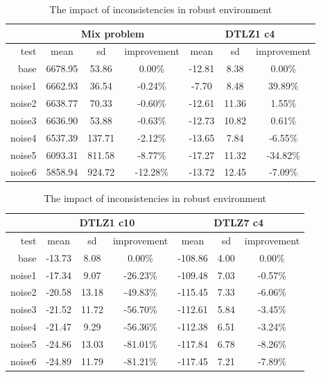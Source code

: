 \begin{table}[htb]
  \centering
  \begin{tabular}{r c c c c c c}
    & \multicolumn{3}{c}{Mix problem} & \multicolumn{3}{c}{DTLZ1 c4} \\
    \hline
    test & mean & sd & improvement & mean & sd & improvement \\
    \hline
    \hline
    base & 6678.95 & 53.86 & 0.00\% & -12.81 & 8.38 & 0.00\% \\
    noise1 & 6662.93 & 36.54 & -0.24\% & -7.70 & 8.48 & 39.89\% \\
    noise2 & 6638.77 & 70.33 & -0.60\% & -12.61 & 11.36 & 1.55\% \\
    noise3 & 6636.90 & 53.88 & -0.63\% & -12.73 & 10.82 & 0.61\% \\
    noise4 & 6537.39 & 137.71 & -2.12\% & -13.65 & 7.84 & -6.55\% \\
    noise5 & 6093.31 & 811.58 & -8.77\% & -17.27 & 11.32 & -34.82\% \\
    noise6 & 5858.94 & 924.72 & -12.28\% & -13.72 & 12.45 & -7.09\% \\
    \hline
  \end{tabular}
  \caption{The impact of inconsistencies in robust environment}
  \label{t:un_noise_1}
\end{table}

 \begin{table}[htb]
  \centering
  \begin{tabular}{r c c c c c c}
    & \multicolumn{3}{c}{DTLZ1 c10} & \multicolumn{3}{c}{DTLZ7 c4} \\
    \hline
    test & mean & sd & improvement & mean & sd & improvement \\
    \hline
    \hline
    base & -13.73 & 8.08 & 0.00\% & -108.86 & 4.00 & 0.00\% \\
    noise1 & -17.34 & 9.07 & -26.23\% & -109.48 & 7.03 & -0.57\% \\
    noise2 & -20.58 & 13.18 & -49.83\% & -115.45 & 7.33 & -6.06\% \\
    noise3 & -21.52 & 11.72 & -56.70\% & -112.61 & 5.84 & -3.45\% \\
    noise4 & -21.47 & 9.29 & -56.36\% & -112.38 & 6.51 & -3.24\% \\
    noise5 & -24.86 & 13.03 & -81.01\% & -117.84 & 6.78 & -8.26\% \\
    noise6 & -24.89 & 11.79 & -81.21\% & -117.45 & 7.21 & -7.89\% \\
    \hline
  \end{tabular}
  \caption{The impact of inconsistencies in robust environment}
  \label{t:un_noise_2}
\end{table}

